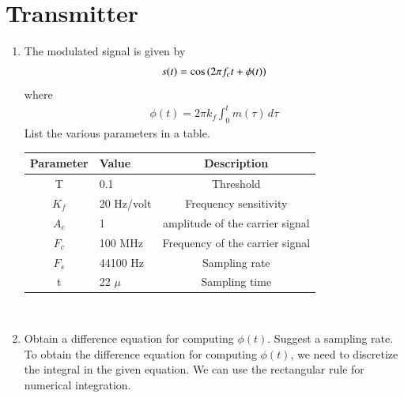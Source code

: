 \documentclass[12pt]{book}
\begin{document}
\section{Transmitter}
\begin{enumerate}
\item The modulated signal is given by 
\begin{align}
	s(t) = \cos\left(2\pi f_c t + \phi(t)\right)
\end{align}
where
\begin{align}
	\phi(t) = 2\pi k_f \int_{0}^{t}m(\tau)\,d\tau
	\label{phi}
\end{align}
List the various parameters in a table.\\
\vspace{10mm}
\begin{tabular}{|c|l|c|}
    \hline 
    \textbf{Parameter} & \textbf{Value} &\textbf{Description} \\ \hline
    T&0.1&Threshold\\
    $K_{f}$ & 20 Hz/volt & Frequency sensitivity \\ 
    $A_c$ & 1  & amplitude of the carrier signal\\ 
    $F_c $& 100 MHz & Frequency of the carrier signal\\ 
    $F_s$ & 44100 Hz & Sampling rate\\ 
    t     & 22 $\mu$ & Sampling time\\  \hline
    \end{tabular}
\\


\item Obtain a difference equation for computing $\phi(t)$.  Suggest a sampling rate.\\

\solution \quad To obtain the difference equation for computing $\phi(t)$, we need to discretize the integral in the given equation. We can use the rectangular rule for numerical integration.\\ 


\end{enumerate}
\end{document}
